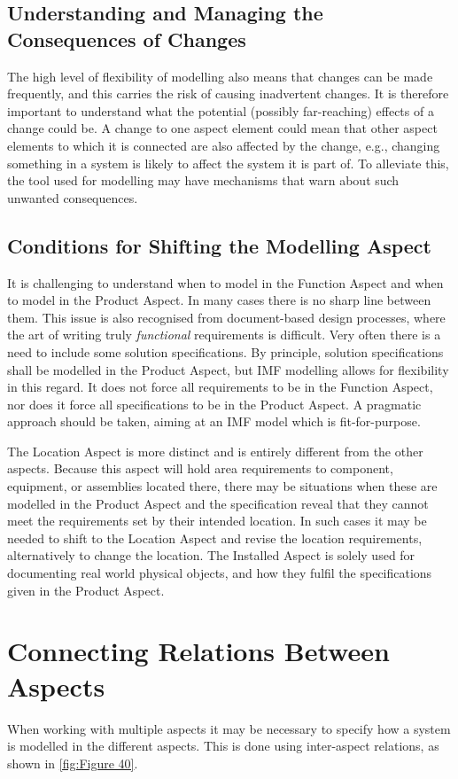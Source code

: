 \documentclass[../main.tex]{subfiles}
\begin{document}
\subsection{Understanding and Managing the Consequences
  of Changes}
The high level of flexibility of modelling also means that changes can be made frequently,
and this carries the risk of causing inadvertent changes. It is therefore important to understand what the potential
(possibly far-reaching) effects of a change could be. A change to one aspect element could mean that other aspect elements to which
it is connected are also affected by the change, e.g., changing something in a system is likely to affect the system
it is part of. To alleviate this, the tool used for modelling may have mechanisms that warn about such unwanted consequences.

\subsection{Conditions for Shifting the Modelling Aspect}
It is challenging to understand when to model in the Function Aspect and when to model
in the Product Aspect. In many cases there is no sharp line between them. This issue is also recognised from
document-based design processes, where the art of writing truly \emph{functional} requirements is difficult. Very
often there is a need to include some solution specifications. By principle, solution specifications shall be
modelled in the Product Aspect, but IMF modelling allows for flexibility in this regard. It does not force all
requirements to be in the Function Aspect, nor does it force all specifications to be in the Product Aspect. A
pragmatic approach should be taken, aiming at an IMF model which is fit-for-purpose.

The Location Aspect is more distinct and is entirely different from the other aspects. Because this aspect will hold
area requirements to component, equipment, or assemblies located there, there may be situations when these are
modelled in the Product Aspect and the specification reveal that they cannot meet the requirements set by their
intended location. In such cases it may be needed to shift to the Location Aspect and revise the location
requirements, alternatively to change the location. 
The Installed Aspect is solely used for documenting real world
physical objects, and how they fulfil the specifications given in the Product Aspect.

\section{Connecting Relations Between Aspects}
When working with multiple aspects it may be necessary to specify how a system is
modelled in the different aspects. This is done using inter-aspect relations, as shown in \autoref{fig:Figure 40}.
\end{document}
